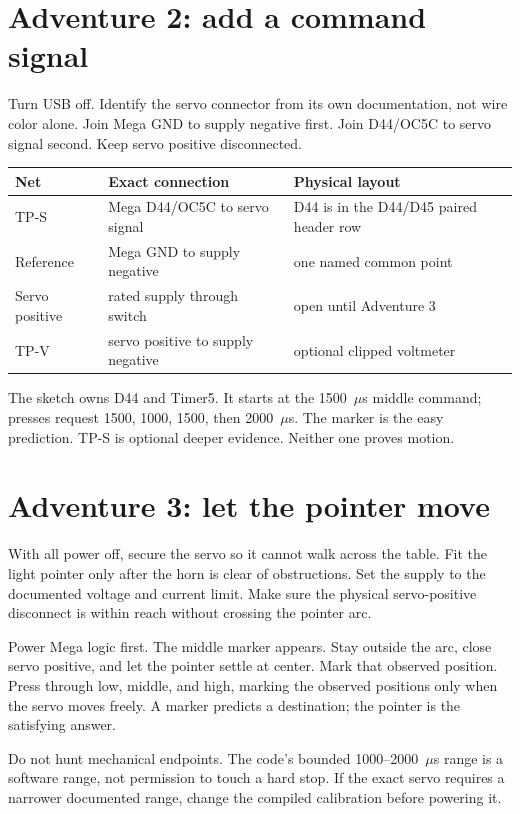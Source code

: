 \documentclass[11pt]{article}
\begin{document}
\section*{Adventure 2: add a command signal}

Turn USB off. Identify the servo connector from its own documentation, not
wire color alone. Join Mega GND to supply negative first. Join D44/OC5C to
servo signal second. Keep servo positive disconnected.

\begin{center}
\begin{tabularx}{0.96\linewidth}{@{}llX@{}}
\toprule
Net & Exact connection & Physical layout\\
\midrule
TP-S & Mega D44/OC5C to servo signal & D44 is in the D44/D45 paired header row\\
Reference & Mega GND to supply negative & one named common point\\
Servo positive & rated supply through switch & open until Adventure 3\\
TP-V & servo positive to supply negative & optional clipped voltmeter\\
\bottomrule
\end{tabularx}
\end{center}

The sketch owns D44 and Timer5. It starts at the 1500~\(\mu\)s middle command;
presses request 1500, 1000, 1500, then 2000~\(\mu\)s. The marker is the easy
prediction. TP-S is optional deeper evidence. Neither one proves motion.

\section*{Adventure 3: let the pointer move}

With all power off, secure the servo so it cannot walk across the table. Fit
the light pointer only after the horn is clear of obstructions. Set the supply
to the documented voltage and current limit. Make sure the physical
servo-positive disconnect is within reach without crossing the pointer arc.

Power Mega logic first. The middle marker appears. Stay outside the arc, close
servo positive, and let the pointer settle at center. Mark that observed
position. Press through low, middle, and high, marking the observed positions
only when the servo moves freely. A marker predicts a destination; the pointer
is the satisfying answer.

Do not hunt mechanical endpoints. The code's bounded 1000--2000~\(\mu\)s range
is a software range, not permission to touch a hard stop. If the exact servo
requires a narrower documented range, change the compiled calibration before
powering it.
\end{document}
